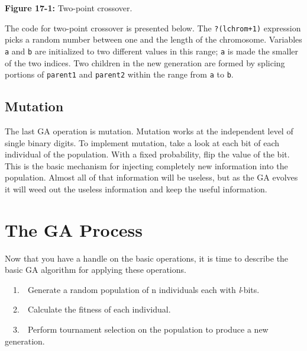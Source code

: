 {\sffamily\bfseries Figure 17-1:}
{\sffamily Two-point crossover.}

The code for two-point crossover is presented below. The
\texttt{?(lchrom+1)} expression picks a random number between one and
the length of the chromosome. Variables \texttt{a} and \texttt{b} are
initialized to two different values in this range; \texttt{a} is made
the smaller of the two indices. Two children in the new generation are
formed by splicing portions of \texttt{parent1} and \texttt{parent2}
within the range from \texttt{a} to \texttt{b}.


\subsection*{Mutation}

The last GA operation is mutation. Mutation works at the independent
level of single binary digits. To implement mutation, take a look at
each bit of each individual of the population. With a fixed
probability, flip the value of the bit. This is the basic mechanism for
injecting completely new information into the population. Almost all of
that information will be useless, but as the GA evolves it will weed
out the useless information and keep the useful information. 

\section{The GA Process}

Now that you have a handle on the basic operations, it is time to
describe the basic GA algorithm for applying these operations. 

\ \ 1.\ \ Generate a random population of n individuals each with
\textit{l}{}-bits.

\ \ 2.\ \ Calculate the fitness of each individual.

\ \ 3.\ \ Perform tournament selection on the population to produce a
new generation.

